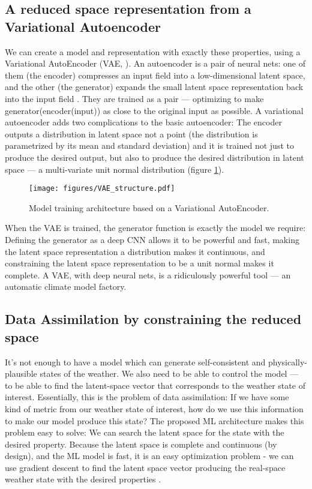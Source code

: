 \documentclass[gmd,manuscript]{copernicus}
\begin{document}
    
\subsection{A reduced space representation from a Variational Autoencoder}

We can create a model and representation with exactly these properties, using a Variational AutoEncoder (VAE, \citet{VAE_Intro}). An autoencoder is a pair of neural nets: one of them (the encoder) compresses an input field into a low-dimensional latent space, and the other (the generator) expands the small latent space representation back into the input field \citep{Autoencoder}. They are trained as a pair --- optimizing to make generator(encoder(input)) as close to the original input as possible. A variational autoencoder adds two complications to the basic autoencoder: The encoder outputs a distribution in latent space not a point (the distribution is parametrized by its mean and standard deviation) and it is trained not just to produce the desired output, but also to produce the desired distribution in latent space  --- a multi-variate unit normal distribution (figure \ref{VAE_structure}).

\begin{figure}[h]
\texttt{[image: figures/VAE\_structure.pdf]}
\caption{Model training architecture based on a Variational AutoEncoder.}
\label{VAE_structure}
\end{figure}

When the VAE is trained, the generator function is exactly the model we require: Defining the generator as a deep CNN allows it to be powerful and fast, making the latent space representation a distribution makes it continuous, and constraining the latent space representation to be a unit normal makes it complete. A VAE, with deep neural nets, is a ridiculously powerful tool --- an automatic climate model factory.
     
\subsection{Data Assimilation by constraining the reduced space}
\label{section_DA}

It's not enough to have a model which can generate self-consistent and physically-plausible states of the weather. We also need to be able to control the model --- to be able to find the latent-space vector that corresponds to the weather state of interest. Essentially, this is the problem of data assimilation: If we have some kind of metric from our weather state of interest, how do we use this information to make our model produce this state?
The proposed ML architecture makes this problem easy to solve: We can search the latent space for the state with the desired property. Because the latent space is complete and continuous (by design), and the ML model is fast, it is an easy optimization problem - we can use gradient descent to find the latent space vector producing the real-space weather state with the desired properties \citep{MLDA}.
\end{document}
